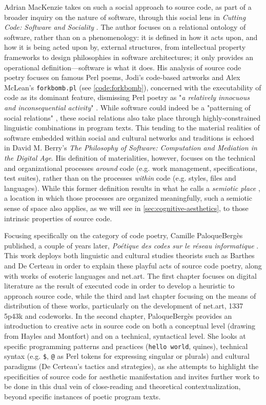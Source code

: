 Adrian MacKenzie takes on such a social approach to source code, as part of a broader inquiry on the nature of software, through this social lens in \emph{Cutting Code: Software and Sociality} \citep{mackenzie_cutting_2006}. The author focuses on a relational ontology of software, rather than on a phenomenology: it is defined in how it acts upon, and how it is being acted upon by, external structures, from intellectual property frameworks to design philosophies in software architectures; it only provides an operational definition—software is what it does. His analysis of source code poetry focuses on famous Perl poems, Jodi's code-based artworks and Alex McLean's \lstinline{forkbomb.pl} (see \ref{code:forkbomb}), concerned with the executability of code as its dominant feature, dismissing Perl poetry as "\emph{a relatively innocuous and inconsequential activity}" \citep{mackenzie_cutting_2006}. While software could indeed be a "patterning of social relations" \citep{mackenzie_cutting_2006}, these social relations also take place through highly-constrained linguistic combinations in program texts. This tending to the material realities of software embedded within social and cultural networks and traditions is echoed in David M. Berry's \emph{The Philosophy of Software: Computation and Mediation in the Digital Age}. His definition of materialities, however, focuses on the technical and organizational processes \emph{around} code (e.g. work management, specifications, test suites), rather than on the processes \emph{within} code (e.g. styles, files and languages). While this former definition results in what he calls a \emph{semiotic place} \citep{berry_philosophy_2011}, a location in which those processes are organized meaningfully, such a semiotic sense of space also applies, as we will see in \ref{sec:cognitive-aesthetics}, to those intrinsic properties of source code.

Focusing specifically on the category of code poetry, Camille PaloqueBergès published, a couple of years later, \emph{Poétique des codes sur le réseau informatique} \citep{paloque-berges_poetique_2009}. This work deploys both linguistic and cultural studies theorists such as Barthes and De Certeau in order to explain these playful acts of source code poetry, along with works of esoteric languages and net.art. The first chapter focuses on digital literature as the result of executed code in order to develop a heuristic to approach source code, while the third and last chapter focusing on the means of distribution of these works, particularly on the development of net.art, 1337 5p43k and codeworks. In the second chapter, PaloqueBergès provides an introduction to creative acts in source code on both a conceptual level (drawing from Hayles and Montfort) and on a technical, syntactical level. She looks at specific programming patterns and practices (\lstinline{hello world}, quines), technical syntax (e.g. \lstinline{$}, \lstinline{@} as Perl tokens for expressing singular or plurals) and cultural paradigms (De Certeau's tactics and strategies), as she attempts to highlight the specificities of source code for aesthetic manifestation and invites further work to be done in this dual vein of close-reading and theoretical contextualization, beyond specific instances of poetic program texts.

